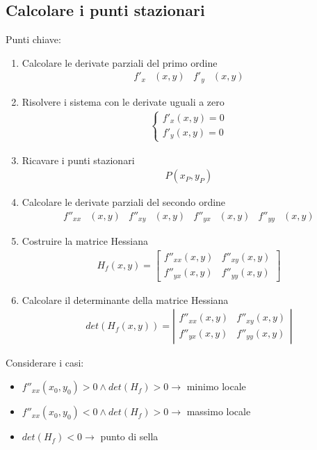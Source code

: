 \documentclass[a4paper]{article}
\begin{document}
	\newpage
	\subsection{Calcolare i punti stazionari}
	Punti chiave:
	\begin{enumerate}
		\item Calcolare le derivate parziali del primo ordine
			\begin{align*}
				f'_x&(x,y)	&	f'_y&(x,y)
			\end{align*}
		\item Risolvere i sistema con le derivate uguali a zero
			\begin{align*}
				\begin{cases}
				f'_x(x,y)=0\\
				f'_y(x,y)=0
				\end{cases}
			\end{align*}
		\item Ricavare i punti stazionari
			\begin{align*}
				P(x_P,y_P)
			\end{align*}
		\item Calcolare le derivate parziali del secondo ordine
			\begin{align*}
				f''_{xx}&(x,y)	&	f''_{xy}&(x,y)	&	f''_{yx}&(x,y)	&	f''_{yy}&(x,y)
			\end{align*}
		\item Costruire la matrice Hessiana
			\begin{align*}
				H_f(x,y) = \left[
				\begin{array}{cc}
				f''_{xx}(x,y) & f''_{xy}(x,y) \\ 
				f''_{yx}(x,y) & f''_{yy}(x,y)
				\end{array} \right]
			\end{align*}
		\item Calcolare il determinante della matrice Hessiana
			\begin{align*}
				det(H_f(x,y)) = \left|
				\begin{array}{cc}
				f''_{xx}(x,y) & f''_{xy}(x,y) \\ 
				f''_{yx}(x,y) & f''_{yy}(x,y)
				\end{array} \right|
				\end{align*}
			\end{enumerate}
		Considerare i casi:\\
			\begin{itemize}
				\item $f''_{xx}(x_0,y_0) > 0 \wedge det(H_f) > 0 \to $ minimo locale
				\item $f''_{xx}(x_0,y_0) < 0 \wedge det(H_f) > 0 \to $ massimo locale
				\item $det(H_f) < 0 \to $ punto di sella
			\end{itemize}
			\newpage
\end{document}
